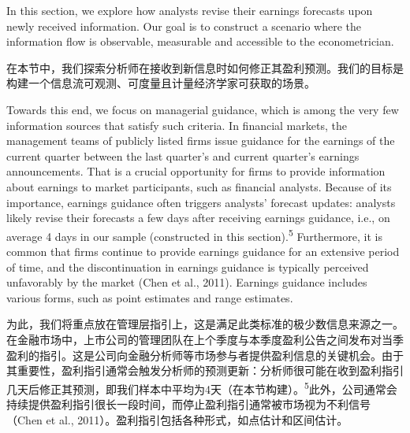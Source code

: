 \documentclass[12pt,a4paper]{article}
\newenvironment{original}
  {\par\medskip\noindent\ignorespaces}
  {\par\medskip}
\newenvironment{translation}
  {\par\noindent{\color{transblue}\ignorespaces}}
  {\par\bigskip}
\begin{document}
\begin{original}
In this section, we explore how analysts revise their earnings forecasts upon newly received information. Our goal is to construct a scenario where the information flow is observable, measurable and accessible to the econometrician.
\end{original}
\begin{translation}
在本节中，我们探索分析师在接收到新信息时如何修正其盈利预测。我们的目标是构建一个信息流可观测、可度量且计量经济学家可获取的场景。
\end{translation}

\begin{original}
Towards this end, we focus on managerial guidance, which is among the very few information sources that satisfy such criteria. In financial markets, the management teams of publicly listed firms issue guidance for the earnings of the current quarter between the last quarter's and current quarter's earnings announcements. That is a crucial opportunity for firms to provide information about earnings to market participants, such as financial analysts. Because of its importance, earnings guidance often triggers analysts' forecast updates: analysts likely revise their forecasts a few days after receiving earnings guidance, i.e., on average 4 days in our sample (constructed in this section).\textsuperscript{5} Furthermore, it is common that firms continue to provide earnings guidance for an extensive period of time, and the discontinuation in earnings guidance is typically perceived unfavorably by the market (Chen et al., 2011). Earnings guidance includes various forms, such as point estimates and range estimates.
\end{original}
\begin{translation}
为此，我们将重点放在管理层指引上，这是满足此类标准的极少数信息来源之一。在金融市场中，上市公司的管理团队在上个季度与本季度盈利公告之间发布对当季盈利的指引。这是公司向金融分析师等市场参与者提供盈利信息的关键机会。由于其重要性，盈利指引通常会触发分析师的预测更新：分析师很可能在收到盈利指引几天后修正其预测，即我们样本中平均为4天（在本节构建）。\textsuperscript{5}此外，公司通常会持续提供盈利指引很长一段时间，而停止盈利指引通常被市场视为不利信号（Chen et al., 2011）。盈利指引包括各种形式，如点估计和区间估计。
\end{translation}
\end{document}
